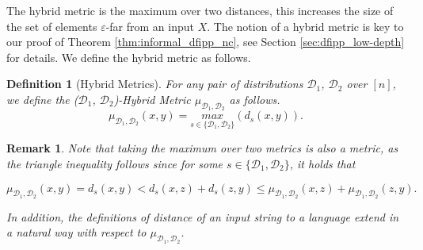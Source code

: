 \documentclass[11pt]{article}
\newtheorem{definition}{Definition}[section]
\newtheorem{remark}{Remark}
\newcommand{\sD}{\mathcal{D}}
\begin{document}
The hybrid metric is the maximum over two distances, this increases the size of the set of elements $\varepsilon$-far from an input $X$. The notion of a hybrid metric is key to our proof of Theorem \ref{thm:informal_dfipp_nc}, see Section \ref{sec:dfipp_low-depth} for details. We define the hybrid metric as follows.

\begin{definition}[Hybrid Metrics]
    For any pair of distributions $\mathcal{D}_{1}$, $\mathcal{D}_{2}$ over $[n]$, we define the \textit{($\mathcal{D}_{1}$, $\mathcal{D}_{2}$)-Hybrid Metric} $\mu_{\mathcal{D}_{1},\mathcal{D}_{2}}$ as follows. 
\begin{equation*}
    \mu_{\mathcal{D}_{1}, \mathcal{D}_{2}}(x,y)=\underset{s\in\{\mathcal{D}_{1}, \mathcal{D}_{2}\}}{max}(d_{s}(x,y)).
\end{equation*}
\end{definition}

\begin{remark}
Note that taking the maximum over two metrics is also a metric, as the triangle inequality follows since for some $s\in \{\mathcal{D}_{1}, \mathcal{D}_{2}\}$, it holds that

\begin{equation*}
    \mu_{\mathcal{D}_{1}, \mathcal{D}_{2}}(x,y)=d_{s}(x,y)<d_{s}(x,z)+d_{s}(z,y)\leq \mu_{\mathcal{D}_{1}, \mathcal{D}_{2}}(x,z)+\mu_{\mathcal{D}_{1}, \mathcal{D}_{2}}(z,y).
\end{equation*}

In addition, the definitions of distance of an input string to a language extend in a natural way with respect to $\mu_{\sD_1,\sD_2}$.
\end{remark}
\end{document}
